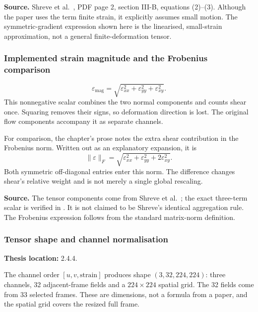 \documentclass[11pt,a4paper]{article}
\numberwithin{equation}{section}
\begin{document}
\textbf{Source.} Shreve et al.~\cite{shreve2011}, PDF page 2,
section III-B, equations (2)--(3). Although the paper uses the term finite
strain, it explicitly assumes small motion. The symmetric-gradient expression
shown here is the linearised, small-strain approximation, not a general
finite-deformation tensor.

\subsubsection{Implemented strain magnitude and the Frobenius comparison}
\label{fg:magnitude}
\begin{equation}
    \varepsilon_{\mathrm{mag}}
       =\sqrt{\varepsilon_{xx}^2+\varepsilon_{yy}^2
                    +\varepsilon_{xy}^2}.
    \label{fg:eq:strain-magnitude}
\end{equation}
This nonnegative scalar combines the two normal components and counts shear
once. Squaring removes their signs, so deformation direction is lost. The
original flow components accompany it as separate channels.

For comparison, the chapter's prose notes the extra shear contribution in the
Frobenius norm. Written out as an explanatory expansion, it is
\begin{equation}
    \|\varepsilon\|_F
      =\sqrt{\varepsilon_{xx}^2+\varepsilon_{yy}^2+2\varepsilon_{xy}^2}.
    \label{fg:eq:frobenius}
\end{equation}
Both symmetric off-diagonal entries enter this norm. The difference changes
shear's relative weight and is not merely a single global rescaling.

\textbf{Source.} The tensor components come from Shreve
et al.~\cite{shreve2011}; the exact three-term scalar is verified in
.
It is not claimed to be Shreve's identical aggregation rule. The Frobenius
expression follows from the standard matrix-norm definition.

\subsubsection{Tensor shape and channel normalisation}
\label{fg:tensor}
\textbf{Thesis location:} 2.4.4.

The channel order $[u,v,\mathrm{strain}]$ produces shape $(3,32,224,224)$:
three channels, 32 adjacent-frame fields and a $224\times224$ spatial grid.
The 32 fields come from 33 selected frames. These are dimensions, not a
formula from a paper, and the spatial grid covers the resized full frame.
\end{document}
